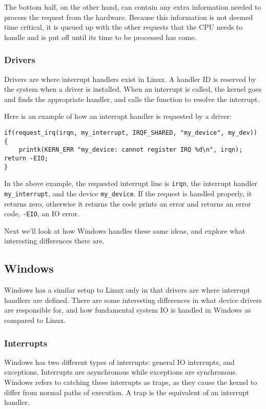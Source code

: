 \documentclass[10pt,letterpaper,onecolumn,draftclsnofoot]{IEEEtran}
\begin{document}
The bottom half, on the other hand, can contain any extra information needed
to process the request from the hardware. Because this information is not deemed
time critical, it is queued up with the other requests that the CPU needs to handle
and is put off until its time to be processed has come. \cite{robertlove2010}

\subsubsection{Drivers}
Drivers are where interrupt handlers exist in Linux. A handler ID is reserved
by the system when a driver is installed. When an interrupt is called, the
kernel goes and finds the appropriate handler, and calls the function to resolve
the interrupt.

Here is an example of how an interrupt handler is requested by a driver:
\begin{lstlisting}[caption=An example of Linux' interrupt handling process]
if(request_irq(irqn, my_interrupt, IRQF_SHARED, "my_device", my_dev)) {
	printk(KERN_ERR "my_device: cannot register IRQ %d\n", irqn);
return -EIO;
}
\end{lstlisting}

In the above example, the requested interrupt line is \texttt{irqn}, the
interrupt handler \texttt{my\_interrupt}, and the device \texttt{my\_device}.
If the request is handled properly, it returns zero, otherwise it returns the
code prints an error and returns an error code, \texttt{-EIO}, an IO error.
\cite{robertlove2010}

Next we'll look at how Windows handles these same ideas, and explore what
interesting differences there are.

\subsection{Windows}
Windows has a similar setup to Linux only in that drivers are where interrupt
handlers are defined. There are some interesting differences in what device
drivers are responsible for, and how fundamental system IO is handled in Windows
as compared to Linux.
\subsubsection{Interrupts}
Windows has two different types of interrupts: general IO interrupts, and
exceptions. Interrupts are asynchronous while exceptions are synchronous. Windows
refers to catching these interrupts as traps, as they cause the kernel to differ
from normal paths of execution. A trap is the equivalent of an interrupt handler.
\cite{internals1}
\end{document}
